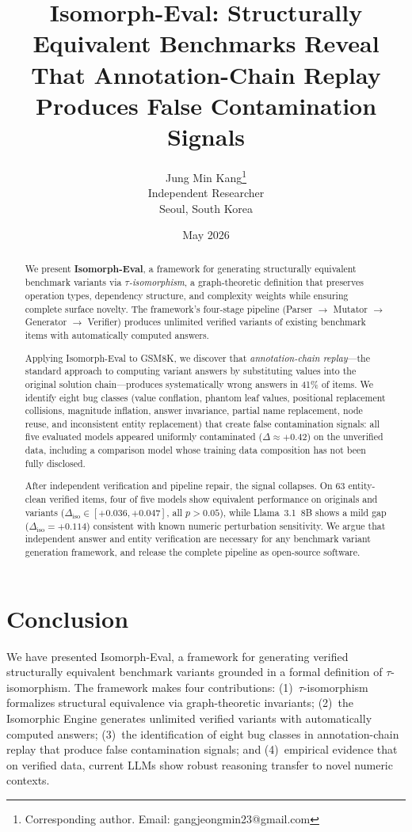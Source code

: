 \documentclass[11pt,a4paper]{article}
\title{Isomorph-Eval: Structurally Equivalent Benchmarks Reveal\\
That Annotation-Chain Replay Produces False Contamination Signals}
\author{Jung Min Kang\thanks{Corresponding author. Email: gangjeongmin23@gmail.com}\\
Independent Researcher\\
Seoul, South Korea}
\date{May 2026}
\begin{document}
\maketitle

\begin{abstract}
We present \textbf{Isomorph-Eval}, a framework for generating
structurally equivalent benchmark variants via \emph{$\tau$-isomorphism},
a graph-theoretic definition that preserves operation types, dependency
structure, and complexity weights while ensuring complete surface
novelty. The framework's four-stage pipeline (Parser $\to$ Mutator
$\to$ Generator $\to$ Verifier) produces unlimited verified variants
of existing benchmark items with automatically computed answers.

Applying Isomorph-Eval to GSM8K, we discover that
\emph{annotation-chain replay}---the standard approach to computing
variant answers by substituting values into the original solution
chain---produces systematically wrong answers in 41\% of items. We
identify eight bug classes (value conflation, phantom leaf values,
positional replacement collisions, magnitude inflation, answer
invariance, partial name replacement, node reuse, and inconsistent
entity replacement) that create
false contamination signals: all five evaluated models appeared
uniformly contaminated ($\Delta \approx +0.42$) on the unverified
data, including a comparison model whose training data composition
has not been fully disclosed.

After independent verification and pipeline repair, the signal
collapses. On 63 entity-clean verified items, four of five models show equivalent
performance on originals and variants
($\Delta_{\mathrm{iso}} \in [+0.036, +0.047]$, all $p > 0.05$),
while Llama~3.1~8B shows a mild gap
($\Delta_{\mathrm{iso}} = +0.114$) consistent with known numeric
perturbation sensitivity. We argue that independent answer and entity
verification are necessary for any benchmark variant generation
framework, and release the complete pipeline as open-source software.
\end{abstract}





\section{Conclusion}
\label{sec:conclusion}

We have presented Isomorph-Eval, a framework for generating verified
structurally equivalent benchmark variants grounded in a formal
definition of $\tau$-isomorphism. The framework makes four
contributions: (1)~$\tau$-isomorphism formalizes structural equivalence
via graph-theoretic invariants; (2)~the Isomorphic Engine generates
unlimited verified variants with automatically computed answers;
(3)~the identification of eight bug classes in annotation-chain replay
that produce false contamination signals; and (4)~empirical evidence
that on verified data, current LLMs show robust reasoning transfer to
novel numeric contexts.
\end{document}
